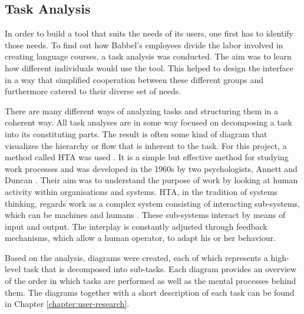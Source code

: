 \subsection{Task Analysis}
In order to build a tool that suits the needs of its users, one first has to identify those needs. To find out how Babbel's employees divide the labor involved in creating language courses, a task analysis was conducted. The aim was to learn how different individuals would use the tool. This helped to design the interface in a way that simplified cooperation between these different groups and furthermore catered to their diverse set of needs.

There are many different ways of analyzing tasks and structuring them in a coherent way. All task analyses are in some way focused on decomposing a task into its constituting parts. The result is often some kind of diagram that visualizes the hierarchy or flow that is inherent to the task. For this project, a method called \ac{HTA} was used \cite{hornsby_hierarchical_2010}. It is a simple but effective method for studying work processes and was developed in the 1960s by two psychologists, Annett and Duncan \cite{shepherd_hierarchial_2000}. Their aim was to understand the purpose of work by looking at human activity within organisations and systems. HTA, in the tradition of systems thinking, regards work as a complex system consisting of  interacting sub-systems, which can be machines and humans \cite{shepherd_hierarchial_2000}. These sub-systems interact by means of input and output. The interplay is constantly adjusted through feedback mechanisms, which allow a human operator, to adapt his or her behaviour.

Based on the analysis, diagrams were created, each of which represents a high-level task that is decomposed into sub-tasks. Each diagram provides an overview of the order in which tasks are performed as well as the mental processes behind them. The diagrams together with a short description of each task can be found in Chapter \ref{chapter:user-research}.

